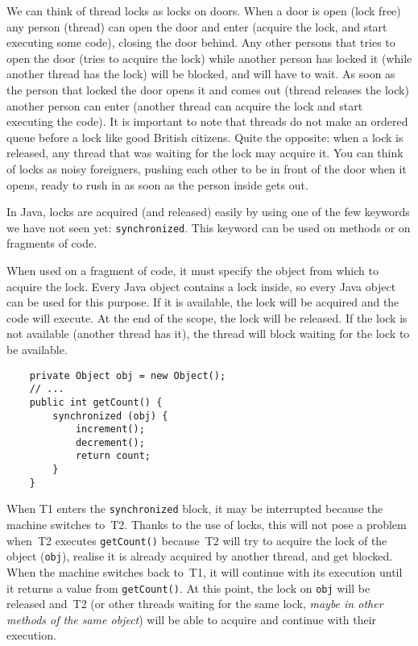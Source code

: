 We can think of thread locks as locks on doors. When a door is open
(lock free) any person (thread) can open the door and enter (acquire
the lock, and start executing some code), 
closing the door behind. Any other persons that tries
to open the door (tries to acquire the lock) 
while another person has locked it
(while another thread has the lock) will be blocked, and will have to wait. As
soon as the person that locked the door opens it and comes out (thread
releases the lock) another person can enter (another thread can
acquire the lock and start executing the code). 
It is important to note that threads do not make an
ordered queue before a lock like good British citizens. Quite the
opposite: when a lock is released, any thread that was waiting for the
lock may acquire it. You can think of locks as noisy foreigners,
pushing each other to be in front of the door when it opens, ready to
rush in as soon as the person inside gets out. 

In Java, locks are acquired (and released) easily by using one of the
few keywords we have not seen yet: \verb+synchronized+. This keyword
can be used on methods or on fragments of code. 

When used on a fragment of code, it must specify the object from which
to acquire the lock. 
%
Every Java object contains a lock inside, so every Java object can be
used for this purpose. 
%
If it is available, the lock will be acquired and the code
will execute. At the end of the scope, the lock will be released. If
the lock is not available (another thread has it), the thread will
block waiting for the lock to be available. 

\begin{verbatim}
    private Object obj = new Object();
    // ...
    public int getCount() {
        synchronized (obj) { 
            increment();
            decrement();
            return count;
        }
    }
\end{verbatim}

When T1 enters the \verb+synchronized+ block, it may be interrupted
because the machine switches to~T2. Thanks to the use of locks, 
this will not pose a problem when~T2 executes
\verb+getCount()+ because~T2 will try to acquire the lock of the
object (\verb+obj+), realise it is already acquired by another
thread, and get blocked. When the machine switches back to~T1, it will
continue with its execution until it returns a value
from \verb+getCount()+. At this point,
the lock on \verb+obj+ will be released and~T2 (or other threads
waiting for the same lock, \emph{maybe in other methods of the same object})
will be able to acquire and continue with their execution. 

